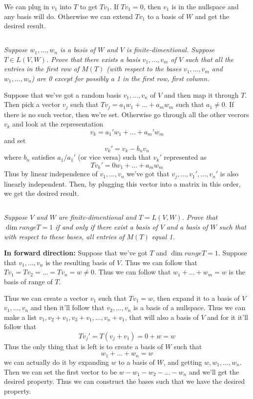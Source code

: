 \documentclass[11pt,oneside,titlepage]{book}
\begin{document}
We can plug in $v_1$ into $T$ to get $T v_1$. If $T v_1 = 0$, then $v_1$ is in the nullspace
and any basis will do. Otherwise we can extend $T v_1$ to a basis of $W$ and get the desired
result.

\subsection{}

\textit{Suppose $w_1, ..., w_n$ is a basis of $W$ and $V$ is finite-dimentional. Suppose
  $T \in L(V, W)$. Prove that there exists a basis $v_1, ..., v_m$ of $V$ such that
  all the entries in the first row of $M(T)$ (with respect to the bases $v_1, ..., v_m$ and
  $w_1, ..., w_n$) are 0 except for possibly a 1 in the first row, first column.}

Suppose that we've got a random basis $v_1, ..., v_n$  of $V$ and then
map it through $T$. Then pick a vector $v_j$ such that $T v_j = a_1 w_1 + ... + a_m w_m$
such that $a_1 \neq 0$. If there is no such vector, then we're set. Otherwise go
through all the other vecrors $v_k$ and look at the representation
$$v_k = a_1' w_1 + ... + a_m' w_m$$
and set 
$$v_k'  = v_k - b_n v_n$$
where $b_n$ satisfies $a_1/a_1'$ (or vice versa) such that $v_k'$ represented as
$$T v_k' = 0 w_1 + ... + a_m w_m$$
Thus by linear independence of $v_1, ..., v_n$ we've got that $v_j, ..., v_1', ..., v_n'$ is
also linearly independent. Then, by plugging this vector into a matrix in this order, we
get the desired result.

\subsection{}

\textit{Suppose $V$ and $W$ are finite-dimentional and $T = L(V, W)$. Prove that
  $\dim range T = 1$ if and only if there exist a basis of $V$ and a basis of $W$
  such that with respect to these bases, all entries of $M(T)$ equal 1.}

\textbf{In forward direction: }
Suppose that we've got $T$ and $\dim range T = 1$.
Suppose that $v_1, ..., v_n$ is the resulting basis of $V$. Thus we can follow that
$T v_1 = T v_2 = ... = T v_n = w \neq 0$. Thus we can follow that $w_1 + ... + w_m = w$ is
the basis of range of $T$.

Thus we can create a vector $v_1$ such that $T v_1 = w$, then expand it to a basis of
$V$ $v_1, ..., v_n$ and then it'll follow that $v_2, ..., v_n$ is a basis of a nullspace.
Thus we can make a list $v_1, v_2 + v_1, v_3 + v_1, ..., v_n + v_1$, that will also a
basis of $V$ and for it it'll follow that
$$T v_j' = T (v_j + v_1) = 0 + w = w$$
Thus the only thing that is left is to create a basis of $W$ such that
$$w_1 + ... + w_n = w$$
we can actually do it by expanding $w$ to a basis of $W$, and getting $w, w_1, ..., w_n$. Then
we can set the first vector to be $w - w_1 - w_2 - ... - w_n$ and we'll get the desired
property. Thus we can construct the bases such that we have the desired property.
\end{document}
